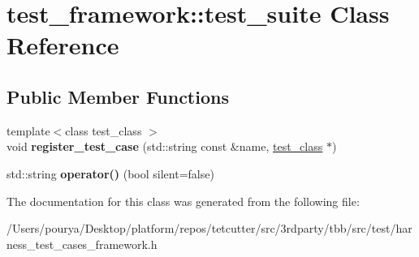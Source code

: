 \hypertarget{classtest__framework_1_1test__suite}{}\section{test\+\_\+framework\+:\+:test\+\_\+suite Class Reference}
\label{classtest__framework_1_1test__suite}
\subsection*{Public Member Functions}
\begin{DoxyCompactItemize}
\item 
\hypertarget{classtest__framework_1_1test__suite_a7e8cf952b53862316b3ccfe2875a0375}{}{\footnotesize template$<$class test\+\_\+class $>$ }\\void {\bfseries register\+\_\+test\+\_\+case} (std\+::string const \&name, \hyperlink{classtest__class}{test\+\_\+class} $\ast$)\label{classtest__framework_1_1test__suite_a7e8cf952b53862316b3ccfe2875a0375}

\item 
\hypertarget{classtest__framework_1_1test__suite_a97dd326e6b9c33185f1170f1a226d99c}{}std\+::string {\bfseries operator()} (bool silent=false)\label{classtest__framework_1_1test__suite_a97dd326e6b9c33185f1170f1a226d99c}

\end{DoxyCompactItemize}


The documentation for this class was generated from the following file\+:\begin{DoxyCompactItemize}
\item 
/\+Users/pourya/\+Desktop/platform/repos/tetcutter/src/3rdparty/tbb/src/test/harness\+\_\+test\+\_\+cases\+\_\+framework.\+h\end{DoxyCompactItemize}
